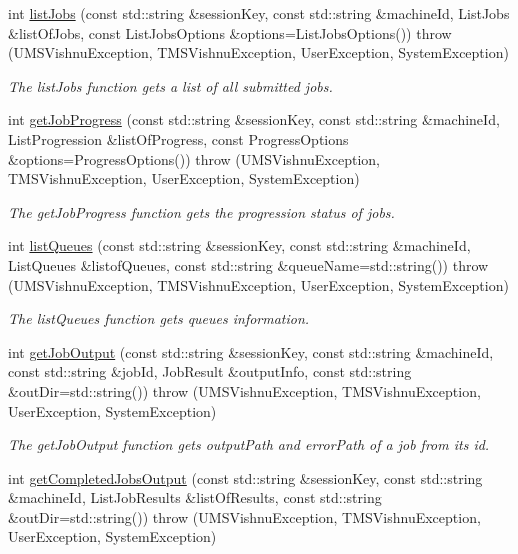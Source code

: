 \begin{DoxyCompactItemize}
int \hyperlink{namespacevishnu_a8e73e05d9006bd3e0388234ccf861538}{listJobs} (const std::string \&sessionKey, const std::string \&machineId, ListJobs \&listOfJobs, const ListJobsOptions \&options=ListJobsOptions())  throw (UMSVishnuException, TMSVishnuException, UserException, SystemException)
\begin{DoxyCompactList}\small\item\em The listJobs function gets a list of all submitted jobs. \item\end{DoxyCompactList}\item 
int \hyperlink{namespacevishnu_a5bc51ba53a335079d0b7044cc2c8f4cc}{getJobProgress} (const std::string \&sessionKey, const std::string \&machineId, ListProgression \&listOfProgress, const ProgressOptions \&options=ProgressOptions())  throw (UMSVishnuException, TMSVishnuException, UserException, SystemException)
\begin{DoxyCompactList}\small\item\em The getJobProgress function gets the progression status of jobs. \item\end{DoxyCompactList}\item 
int \hyperlink{namespacevishnu_ada2d98155cffa475261261fb33f7e873}{listQueues} (const std::string \&sessionKey, const std::string \&machineId, ListQueues \&listofQueues, const std::string \&queueName=std::string())  throw (UMSVishnuException, TMSVishnuException, UserException, SystemException)
\begin{DoxyCompactList}\small\item\em The listQueues function gets queues information. \item\end{DoxyCompactList}\item 
int \hyperlink{namespacevishnu_a6e0b3df33a91bd16cdadf3ac428fcf0e}{getJobOutput} (const std::string \&sessionKey, const std::string \&machineId, const std::string \&jobId, JobResult \&outputInfo, const std::string \&outDir=std::string())  throw (UMSVishnuException, TMSVishnuException, UserException, SystemException)
\begin{DoxyCompactList}\small\item\em The getJobOutput function gets outputPath and errorPath of a job from its id. \item\end{DoxyCompactList}\item 
int \hyperlink{namespacevishnu_aaedc4b5676f0c8e47f333316cff0b0a8}{getCompletedJobsOutput} (const std::string \&sessionKey, const std::string \&machineId, ListJobResults \&listOfResults, const std::string \&outDir=std::string())  throw (UMSVishnuException, TMSVishnuException, UserException, SystemException)

\end{DoxyCompactItemize}

